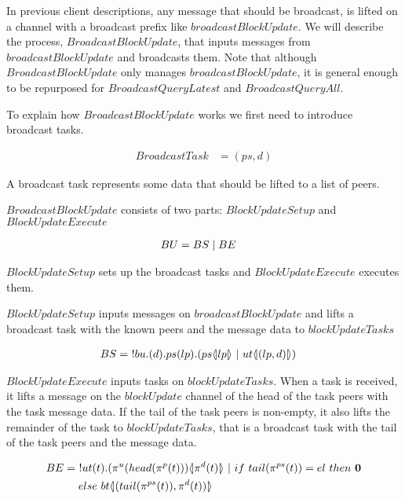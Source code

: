 In previous client descriptions, any message that should be broadcast, is lifted on a channel with a broadcast prefix like $broadcastBlockUpdate$.
We will describe the process, $BroadcastBlockUpdate$, that inputs messages from $broadcastBlockUpdate$ and broadcasts them.
Note that although $BroadcastBlockUpdate$ only manages $broadcastBlockUpdate$, it is general enough to be repurposed for $BroadcastQueryLatest$ and $BroadcastQueryAll$.

To explain how $BroadcastBlockUpdate$ works we first need to introduce broadcast tasks.

\begin{align*}
    BroadcastTask &= (ps, d)
\end{align*}

A broadcast task represents some data that should be lifted to a list of peers.

$BroadcastBlockUpdate$ consists of two parts: $BlockUpdateSetup$ and $BlockUpdateExecute$

\begin{align*}
    BU &= BS \mid BE
\end{align*}

$BlockUpdateSetup$ sets up the broadcast tasks and $BlockUpdateExecute$ executes them.

$BlockUpdateSetup$ inputs messages on $broadcastBlockUpdate$ and lifts a broadcast task with the known peers and the message data to $blockUpdateTasks$

\begin{align*}
    BS &=\ !bu.(d).ps(lp).(ps \langle \! | lp | \! \rangle\ |\ ut \langle \! | (lp,d) | \! \rangle)
\end{align*}

$BlockUpdateExecute$ inputs tasks on $blockUpdateTasks$.
When a task is received, it lifts a message on the $blockUpdate$ channel of the head of the task peers with the task message data.
If the tail of the task peers is non-empty, it also lifts the remainder of the task to $blockUpdateTasks$, that is a broadcast task with the tail of the task peers and the message data.

\begin{align*}
    BE &=\ !ut(t).(\pi^{u}(head(\pi^{p}(t)))\lift{}{\pi^{d}(t)}\ |\ if\ tail(\pi^{ps}(t))=el\ then\ \nil\\
    &\quad\ else\ bt\lift{}{(tail(\pi^{ps}(t)),\pi^{d}(t))}
\end{align*}
